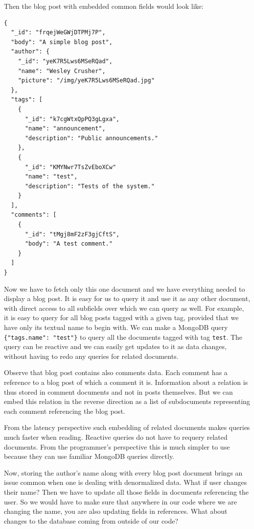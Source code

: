 Then the blog post with embedded common fields would look like:

\begin{verbatim}
{
  "_id": "frqejWeGWjDTPMj7P",
  "body": "A simple blog post",
  "author": {
    "_id": "yeK7R5Lws6MSeRQad",
    "name": "Wesley Crusher",
    "picture": "/img/yeK7R5Lws6MSeRQad.jpg"
  },
  "tags": [
    {
      "_id": "k7cgWtxQpPQ3gLgxa",
      "name": "announcement",
      "description": "Public announcements."
    },
    {
      "_id": "KMYNwr7TsZvEboXCw"
      "name": "test",
      "description": "Tests of the system."
    }
  ],
  "comments": [
    {
      "_id": "tMgj8mF2zF3gjCftS",
      "body": "A test comment."
    }
  ]
}
\end{verbatim}

Now we have to fetch only this one document and we have everything needed to display a blog post.
It is easy for us to query it and use it as any other document, with direct access to all subfields over which we can query as well.
For example, it is easy to query for all blog posts tagged with a given tag, provided that we have only its textual name to begin with.
We can make a MongoDB query \verb|{"tags.name": "test"}| to query all the documents tagged with tag \verb|test|.
The query can be reactive and we can easily get updates to it as data changes, without having to redo any queries for related documents.

Observe that blog post contains also comments data.
Each comment has a reference to a blog post of which a comment it is.
Information about a relation is thus stored in comment documents and not in posts themselves.
But we can embed this relation in the reverse direction as a list of subdocuments representing each comment referencing the blog post.

From the latency perspective such embedding of related documents makes queries much faster when reading.
Reactive queries do not have to requery related documents.
From the programmer's perspective this is much simpler to use because they can use familiar MongoDB queries directly.

Now, storing the author's name along with every blog post document brings an issue common when one is dealing with denormalized data.
What if user changes their name?
Then we have to update all those fields in documents referencing the user.
So we would have to make sure that anywhere in our code where we are changing the name, you are also updating fields in references.
What about changes to the database coming from outside of our code?


